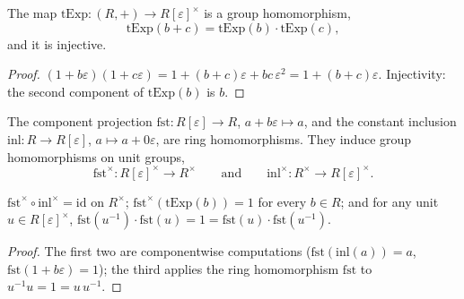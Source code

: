 \begin{lemma}
  \label{pa-lem:truncExp_add}
  \leanok

  The map \(\mathrm{tExp} : (R, +) \to R[\varepsilon]^\times\) is a group homomorphism,
  \[
    \mathrm{tExp}(b + c) = \mathrm{tExp}(b) \cdot \mathrm{tExp}(c),
  \]
  and it is injective.
\end{lemma}
\begin{proof}
  \leanok
  \((1 + b\varepsilon)(1 + c\varepsilon) = 1 + (b + c)\varepsilon +
  bc\,\varepsilon^2 = 1 + (b+c)\varepsilon\). Injectivity: the second component of
  \(\mathrm{tExp}(b)\) is \(b\).
\end{proof}

\begin{definition}
  \label{pa-def:unitsFst}
  \leanok

  The component projection \(\mathrm{fst} : R[\varepsilon] \to R\),
  \(a + b\varepsilon \mapsto a\), and the constant inclusion
  \(\mathrm{inl} : R \to R[\varepsilon]\), \(a \mapsto a + 0\varepsilon\), are ring
  homomorphisms. They induce group homomorphisms on unit groups,
  \[
    \mathrm{fst}^\times : R[\varepsilon]^\times \to R^\times
    \qquad\text{and}\qquad
    \mathrm{inl}^\times : R^\times \to R[\varepsilon]^\times .
  \]
\end{definition}

\begin{lemma}
  \label{pa-lem:unitsFst_split}
  \leanok

  \(\mathrm{fst}^\times \circ \mathrm{inl}^\times = \mathrm{id}\) on \(R^\times\);
  \(\mathrm{fst}^\times(\mathrm{tExp}(b)) = 1\) for every \(b \in R\); and for any unit
  \(u \in R[\varepsilon]^\times\),
  \(\mathrm{fst}(u^{-1}) \cdot \mathrm{fst}(u) = 1 = \mathrm{fst}(u) \cdot
  \mathrm{fst}(u^{-1})\).
\end{lemma}
\begin{proof}
  \leanok
  The first two are componentwise computations
  (\(\mathrm{fst}(\mathrm{inl}(a)) = a\), \(\mathrm{fst}(1 + b\varepsilon) = 1\)); the
  third applies the ring homomorphism \(\mathrm{fst}\) to
  \(u^{-1} u = 1 = u\,u^{-1}\).
\end{proof}

